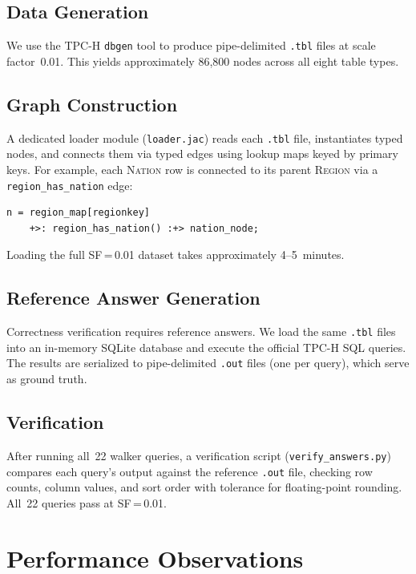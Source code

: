 \documentclass[11pt]{article}
\begin{document}
\subsection{Data Generation}

We use the TPC-H \texttt{dbgen} tool to produce pipe-delimited
\texttt{.tbl} files at scale factor~0.01.
This yields approximately 86{,}800 nodes across all eight table types.

\subsection{Graph Construction}

A dedicated loader module (\texttt{loader.jac}) reads each \texttt{.tbl}
file, instantiates typed nodes, and connects them via typed edges using
lookup maps keyed by primary keys.
For example, each \textsc{Nation} row is connected to its parent
\textsc{Region} via a \lstinline|region_has_nation| edge:

\begin{lstlisting}
n = region_map[regionkey]
    +>: region_has_nation() :+> nation_node;
\end{lstlisting}

Loading the full SF\,=\,0.01 dataset takes approximately 4--5~minutes.

\subsection{Reference Answer Generation}

Correctness verification requires reference answers.
We load the same \texttt{.tbl} files into an in-memory SQLite database
and execute the official TPC-H SQL queries.
The results are serialized to pipe-delimited \texttt{.out} files
(one per query), which serve as ground truth.

\subsection{Verification}

After running all~22 walker queries, a verification script
(\texttt{verify\_answers.py}) compares each query's output against the
reference \texttt{.out} file, checking row counts, column values, and
sort order with tolerance for floating-point rounding.
All~22 queries pass at SF\,=\,0.01.

\section{Performance Observations}
\end{document}

